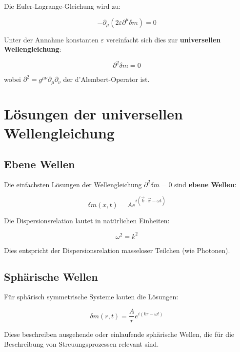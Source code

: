 \documentclass[12pt,a4paper]{report}
\begin{document}
	Die Euler-Lagrange-Gleichung wird zu:
	
	\begin{equation}
		-\partial_\mu(2\varepsilon \partial^\mu\delta m) = 0
	\end{equation}
	
	Unter der Annahme konstanten $\varepsilon$ vereinfacht sich dies zur \textbf{universellen Wellengleichung}:
	
	\begin{equation}
		\partial^2\delta m = 0
	\end{equation}
	
	wobei $\partial^2 = g^{\mu\nu} \partial_\mu\partial_\nu$ der d'Alembert-Operator ist.
	
	\section{Lösungen der universellen Wellengleichung}
	
	\subsection{Ebene Wellen}
	
	Die einfachsten Lösungen der Wellengleichung $\partial^2\delta m = 0$ sind \textbf{ebene Wellen}:
	
	\begin{equation}
		\delta m(x,t) = A e^{i(\vec{k} \cdot \vec{x} - \omega t)}
	\end{equation}
	
	Die Dispersionsrelation lautet in natürlichen Einheiten:
	
	\begin{equation}
		\omega^2 = k^2
	\end{equation}
	
	Dies entspricht der Dispersionsrelation masseloser Teilchen (wie Photonen).
	
	\subsection{Sphärische Wellen}
	
	Für sphärisch symmetrische Systeme lauten die Lösungen:
	
	\begin{equation}
		\delta m(r,t) = \frac{A}{r} e^{i(kr - \omega t)}
	\end{equation}
	
	Diese beschreiben ausgehende oder einlaufende sphärische Wellen, die für die Beschreibung von Streuungsprozessen relevant sind.
	
\end{document}

